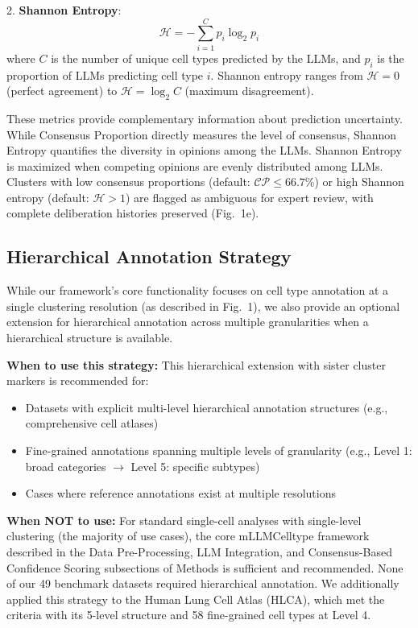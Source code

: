 \documentclass[pdflatex,sn-nature]{sn-jnl}%
\theoremstyle{thmstyleone}%
\theoremstyle{thmstyletwo}%
\theoremstyle{thmstylethree}%
\begin{document}
2. \textbf{Shannon Entropy}:
\begin{equation}
\mathcal{H} = -\sum_{i=1}^{C} p_i \log_2 p_i
\end{equation}
where $C$ is the number of unique cell types predicted by the LLMs, and $p_i$ is the proportion of LLMs predicting cell type $i$. Shannon entropy ranges from $\mathcal{H} = 0$ (perfect agreement) to $\mathcal{H} = \log_2 C$ (maximum disagreement).

These metrics provide complementary information about prediction uncertainty. While Consensus Proportion directly measures the level of consensus, Shannon Entropy quantifies the diversity in opinions among the LLMs.  Shannon Entropy is maximized when competing opinions are evenly distributed among LLMs.
Clusters with low consensus proportions (default: $\mathcal{CP} \leq 66.7\%$) or high Shannon entropy (default: $\mathcal{H} > 1$) are flagged as ambiguous for expert review, with complete deliberation histories preserved (Fig.~1e).

\subsection{Hierarchical Annotation Strategy}

While our framework's core functionality focuses on cell type annotation at a single clustering resolution (as described in Fig.~1), we also provide an optional extension for hierarchical annotation across multiple granularities when a hierarchical structure is available.

\textbf{When to use this strategy:} This hierarchical extension with sister cluster markers is recommended for:
\begin{itemize}
    \item Datasets with explicit multi-level hierarchical annotation structures (e.g., comprehensive cell atlases)
    \item Fine-grained annotations spanning multiple levels of granularity (e.g., Level 1: broad categories $\rightarrow$ Level 5: specific subtypes)
    \item Cases where reference annotations exist at multiple resolutions
\end{itemize}

\textbf{When NOT to use:} For standard single-cell analyses with single-level clustering (the majority of use cases), the core mLLMCelltype framework described in the Data Pre-Processing, LLM Integration, and Consensus-Based Confidence Scoring subsections of Methods is sufficient and recommended. None of our 49 benchmark datasets required hierarchical annotation. We additionally applied this strategy to the Human Lung Cell Atlas (HLCA), which met the criteria with its 5-level structure and 58 fine-grained cell types at Level 4.
\end{document}
